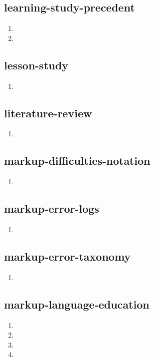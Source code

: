 \documentclass{article}
\begin{document}
\subsection{learning-study-precedent}
\begin{enumerate}
\item {}
\item {}
\end{enumerate}

\subsection{lesson-study}
\begin{enumerate}
\item {}
\end{enumerate}

\subsection{literature-review}
\begin{enumerate}
\item {}
\end{enumerate}

\subsection{markup-difficulties-notation}
\begin{enumerate}
\item {}
\end{enumerate}

\subsection{markup-error-logs}
\begin{enumerate}
\item {}
\end{enumerate}

\subsection{markup-error-taxonomy}
\begin{enumerate}
\item {}
\end{enumerate}

\subsection{markup-language-education}
\begin{enumerate}
\item {}
\item {}
\item {}
\item {}
\end{enumerate}
\end{document}
